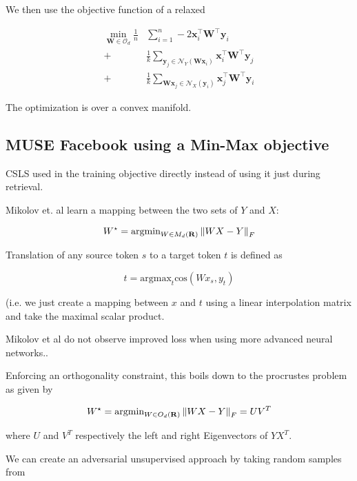 \documentclass[a4paper,12pt,twoside,openright]{report}
\begin{document}
We then use the objective function of a relaxed 

\begin{align} 
\min _{\mathbf{W} \in \mathcal{O}_{d}} \frac{1}{n} & \sum_{i=1}^{n}-2 \mathbf{x}_{i}^{\top} \mathbf{W}^{\top} \mathbf{y}_{i} \\+& \frac{1}{k} \sum_{\mathbf{y}_{j} \in \mathcal{N}_{Y}\left(\mathbf{W} \mathbf{x}_{i}\right)} \mathbf{x}_{i}^{\top} \mathbf{W}^{\top} \mathbf{y}_{j} \\+& \frac{1}{k} \sum_{\mathbf{W} \mathbf{x}_{j} \in \mathcal{N}_{X}\left(\mathbf{y}_{i}\right)} \mathbf{x}_{j}^{\top} \mathbf{W}^{\top} \mathbf{y}_{i} 
\end{align}

The optimization is over a convex manifold.



\subsection{MUSE Facebook using a Min-Max objective}

CSLS used in the training objective directly instead of using it just during retrieval.

Mikolov et. al learn a mapping between the two sets of $Y$ and $X$:

\begin{equation}
W^{\star} = \text{argmin}_{W \in M_d(\mathbf{R})} \left\lVert WX - Y\right\rVert_F
\end{equation}

Translation of any source token $s$ to a target token $t$ is defined as 

$$
t = \text{argmax}_t \text{cos} (Wx_s, y_t)
$$

(i.e. we just create a mapping between $x$ and $t$ using a linear interpolation matrix and take the maximal scalar product.

Mikolov et al do not observe improved loss when using more advanced neural networks..

Enforcing an orthogonality constraint, this boils down to the procrustes problem as given by

\begin{equation}
W^\star = \text{argmin}_{W \in O_d(\mathbf{R}) } \left\lVert WX - Y\right\rVert_F = UV^T 
\end{equation}

where $U$ and $V^T$ respectively the left and right Eigenvectors of $YX^T$.

We can create an adversarial unsupervised approach by taking random samples from 
\end{document}
